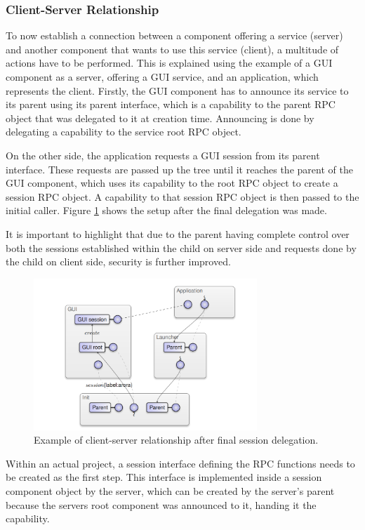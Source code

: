 \subsubsection{Client-Server Relationship}
To now establish a connection between a component offering a service (server) and another component that wants to use this service (client), a multitude of actions have to be performed. This is explained using the example of a GUI component as a server, offering a GUI service, and an application, which represents the client. Firstly, the GUI component has to announce its service to its parent using its parent interface, which is a capability to the parent RPC object that was delegated to it at creation time. Announcing is done by delegating a capability to the service root RPC object. 

On the other side, the application requests a GUI session from its parent interface. These requests are passed up the tree until it reaches the parent of the GUI component, which uses its capability to the root RPC object to create a session RPC object. A capability to that session RPC object is then passed to the initial caller. Figure \ref{fig:client-server} shows the setup after the final delegation was made. 

It is important to highlight that due to the parent having complete control over both the sessions established within the child on server side and requests done by the child on client side, security is further improved. \cite[P.50-54]{genode_foundations}
\begin{figure}
    \centering
    \includegraphics[width=0.75\textwidth]{Images/client-server.PNG}
    \caption{Example of client-server relationship after final session delegation. \cite[P.52]{genode_foundations}}
    \label{fig:client-server}
\end{figure}
\newline
\newline
Within an actual project, a session interface defining the RPC functions needs to be created as the first step. This interface is implemented inside a session component object by the server, which can be created by the server's parent because the servers root component was announced to it, handing it the capability. 

